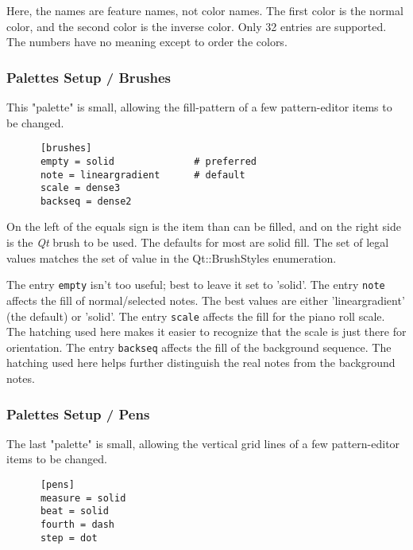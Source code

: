    Here, the names are feature names, not color names.  The first color is the
   normal color, and the second color is the inverse color.  Only 32 entries
   are supported. The numbers have no meaning except to order the colors.

\subsubsection{Palettes Setup / Brushes}
\label{subsubsec:palettes_setup_brushes}

   This "palette" is small, allowing the fill-pattern of a few pattern-editor
   items to be changed.

   \begin{verbatim}
      [brushes]
      empty = solid              # preferred
      note = lineargradient      # default
      scale = dense3
      backseq = dense2
   \end{verbatim}

   On the left of the equals sign is the item than can be filled, and on the
   right side is the \textsl{Qt} brush to be used.  The defaults for most are
   solid fill.
   The set of legal values matches the set
   of value in the Qt::BrushStyles enumeration.

   The entry \texttt{empty} isn't too useful; best to leave it set to 'solid'.
   The entry \texttt{note} affects the fill of normal/selected notes.
   The best values are either 'lineargradient' (the default) or 'solid'.
   The entry \texttt{scale} affects the fill for the piano roll scale.  The
   hatching used here makes it easier to recognize that the scale is just there
   for orientation.
   The entry \texttt{backseq} affects the fill of the background sequence.  The
   hatching used here helps further distinguish the real notes from the
   background notes.

\subsubsection{Palettes Setup / Pens}
\label{subsubsec:palettes_setup_pens}

   The last "palette" is small, allowing the vertical grid lines
   of a few pattern-editor
   items to be changed.

   \begin{verbatim}
      [pens]
      measure = solid
      beat = solid
      fourth = dash
      step = dot
   \end{verbatim}

